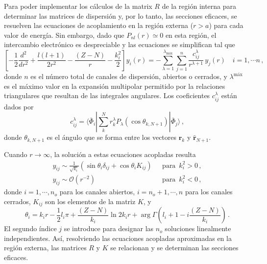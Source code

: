 Para poder implementar los cálculos de la matrix $R$ de la región 
interna para determinar las matrices de dispersión y, por lo tanto, las 
secciones eficaces, se resuelven las ecuaciones de acoplamiento en la 
región externa ($r>a$) para cada valor de energía. Sin embargo, dado 
que $P_{nl}(r)\simeq 0$ en esta región, el intercambio electrónico es
despreciable y las ecuaciones se simplifican tal que
\begin{equation}
\left[-\frac{1}{2}\frac{d^2}{dr^2}+\frac{l(l+1)}{2r^2}-\frac{(Z-N)}{r}
-\frac{k_i^2}{2}\right]y_i(r)=-\sum_{\lambda=1}^{\lambda_{\textrm{máx}}}
\sum_{j=1}^{n}\frac{c_{ij}^{\lambda}}{r^{\lambda+1}}\,y_j(r)
\quad i=1,\cdots n\,,
\label{eq:RM-outer}
\end{equation}
donde $n$ es el número total de canales de dispersión, abiertos o 
cerrados, y $\lambda^{\textrm{máx}}$ es el máximo valor en la expansión
multipolar permitido por la relaciones triangulares que resultan de las 
integrales angulares. Los coeficientes $c_{ij}^{\lambda}$ están dados 
por
\begin{equation}
c_{ij}^{\lambda}=\langle\bar{\Phi}_i\left|\sum_k^Nr_k^{\lambda}
P_{\lambda}\left(\cos\theta_{k,N+1}\right)\right|\bar{\Phi}_j\rangle\,,
\end{equation}
donde $\theta_{k,N+1}$ es el ángulo que se forma entre los vectores 
$\hat{\mathbf{r}}_{k}$ y $\hat{\mathbf{r}}_{N+1}$. 

Cuando $r\rightarrow\infty$, la solución a estas ecuaciones acopladas
resulta
\begin{equation}
\begin{array}{ll}
y_{ij}\sim\frac{1}{\sqrt{k_i}}\left(\sin\theta_i\delta_{ij}+\cos\theta_i
K_{ij}\right) \,\,&\,\,\textrm{para }\,k_i^2>0\,,\\
y_{ij}\sim\mathcal{O}\left(r^{-2}\right) \,\,&\,\,\textrm{para }\,k_i^2<0\,,
\end{array}
\end{equation}
donde $i=1,\cdots,n_o$ para los canales abiertos, $i=n_o+1,\cdots,n$ 
para los canales cerrados, $K_{ij}$ son los elementos de la matriz $K$,
y 
\begin{equation}
\theta_i=k_ir-\frac{1}{2}l_i\pi+\frac{(Z-N)}{k_i}\ln 2k_i r +\arg \Gamma
\left(l_i+1-i\frac{(Z-N)}{k_i}\right)\,.
\end{equation}
El segundo índice $j$ se introduce para designar las $n_o$ soluciones 
linealmente independientes. Así, resolviendo las ecuaciones acopladas
aproximadas en la región externa, las matrices $R$ y $K$ se relacionan 
y se determinan las secciones eficaces.






